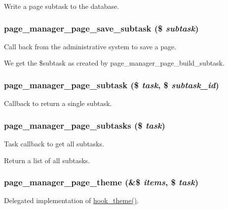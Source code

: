 \label{page_8inc_a2201f36620dbaa3f8a3a44b69870c91c}
Write a page subtask to the database. \hypertarget{page_8inc_a86005bf57efc31c24e501a4ac8a1b9d6}{
\subsubsection[{page\_\-manager\_\-page\_\-save\_\-subtask}]{\setlength{\rightskip}{0pt plus 5cm}page\_\-manager\_\-page\_\-save\_\-subtask (\$ {\em subtask})}}
\label{page_8inc_a86005bf57efc31c24e501a4ac8a1b9d6}
Call back from the administrative system to save a page.

We get the \$subtask as created by page\_\-manager\_\-page\_\-build\_\-subtask. \hypertarget{page_8inc_a428528644ba98663d068f76e2112da20}{
\subsubsection[{page\_\-manager\_\-page\_\-subtask}]{\setlength{\rightskip}{0pt plus 5cm}page\_\-manager\_\-page\_\-subtask (\$ {\em task}, \/  \$ {\em subtask\_\-id})}}
\label{page_8inc_a428528644ba98663d068f76e2112da20}
Callback to return a single subtask. \hypertarget{page_8inc_a2cfdc726207781912bf8e66d1f2d79e6}{
\subsubsection[{page\_\-manager\_\-page\_\-subtasks}]{\setlength{\rightskip}{0pt plus 5cm}page\_\-manager\_\-page\_\-subtasks (\$ {\em task})}}
\label{page_8inc_a2cfdc726207781912bf8e66d1f2d79e6}
Task callback to get all subtasks.

Return a list of all subtasks. \hypertarget{page_8inc_a2d83630a85dcb6a388396698a92b65d6}{
\subsubsection[{page\_\-manager\_\-page\_\-theme}]{\setlength{\rightskip}{0pt plus 5cm}page\_\-manager\_\-page\_\-theme (\&\$ {\em items}, \/  \$ {\em task})}}
\label{page_8inc_a2d83630a85dcb6a388396698a92b65d6}
Delegated implementation of \hyperlink{group__hooks_ga013ccb45c7aaab1c16cf9691428c910d}{hook\_\-theme()}. 